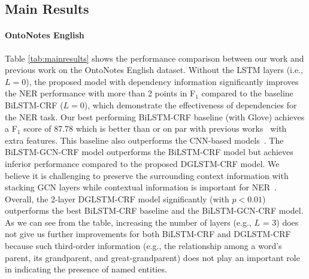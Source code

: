 \subsection{Main Results}



\paragraph{OntoNotes English}
Table \ref{tab:mainresults} shows the performance comparison between our work and previous work on the OntoNotes English dataset. 
Without the LSTM layers (i.e., $L=0$), the proposed model with dependency information significantly improves the NER performance with more than 2 points in F$_1$ compared to the baseline BiLSTM-CRF ($L=0$), which demonstrate the effectiveness of dependencies for the NER task.
Our best performing BiLSTM-CRF baseline (with Glove) achieves a F$_1$ score of 87.78 which is better than or on par with previous works~\cite{chiu2016named,li2017leveraging,ghaddar2018robust} with extra features. 
This baseline also outperforms the CNN-based models~\cite{strubell2017fast,li2017leveraging}. 
The BiLSTM-GCN-CRF model outperforms the BiLSTM-CRF model but achieves inferior performance compared to the proposed DGLSTM-CRF model. 
We believe it is challenging to preserve the surrounding context information with stacking GCN layers while contextual information is important for NER~\cite{peters2018dissecting}.
Overall, the 2-layer DGLSTM-CRF model significantly (with $p < 0.01$) outperforms the best BiLSTM-CRF baseline and the BiLSTM-GCN-CRF model. 
As we can see from the table, increasing the number of layers (e.g., $L$ = $3$) does not give us further improvements for both BiLSTM-CRF and DGLSTM-CRF because such third-order information (e.g., the relationship among a word’s parent, its grandparent, and great-grandparent) does not play an important role in indicating the presence of named entities.

